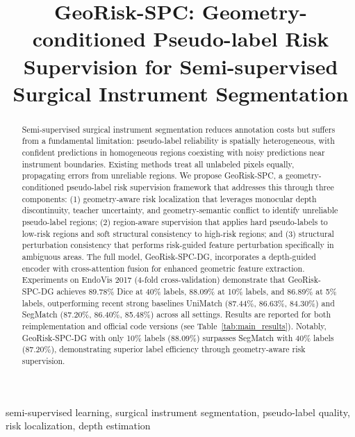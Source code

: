 \documentclass[conference]{IEEEtran}
\begin{document}
\title{GeoRisk-SPC: Geometry-conditioned Pseudo-label Risk Supervision for Semi-supervised Surgical Instrument Segmentation}

\author{
}

\maketitle

\begin{abstract}
Semi-supervised surgical instrument segmentation reduces annotation costs but suffers from a fundamental limitation: pseudo-label reliability is spatially heterogeneous, with confident predictions in homogeneous regions coexisting with noisy predictions near instrument boundaries. Existing methods treat all unlabeled pixels equally, propagating errors from unreliable regions. We propose GeoRisk-SPC, a geometry-conditioned pseudo-label risk supervision framework that addresses this through three components: (1) geometry-aware risk localization that leverages monocular depth discontinuity, teacher uncertainty, and geometry-semantic conflict to identify unreliable pseudo-label regions; (2) region-aware supervision that applies hard pseudo-labels to low-risk regions and soft structural consistency to high-risk regions; and (3) structural perturbation consistency that performs risk-guided feature perturbation specifically in ambiguous areas. The full model, GeoRisk-SPC-DG, incorporates a depth-guided encoder with cross-attention fusion for enhanced geometric feature extraction. Experiments on EndoVis 2017 (4-fold cross-validation) demonstrate that GeoRisk-SPC-DG achieves 89.78\% Dice at 40\% labels, 88.09\% at 10\% labels, and 86.89\% at 5\% labels, outperforming recent strong baselines UniMatch (87.44\%, 86.63\%, 84.30\%) and SegMatch (87.20\%, 86.40\%, 85.48\%) across all settings. Results are reported for both reimplementation and official code versions (see Table~\ref{tab:main_results}). Notably, GeoRisk-SPC-DG with only 10\% labels (88.09\%) surpasses SegMatch with 40\% labels (87.20\%), demonstrating superior label efficiency through geometry-aware risk supervision.
\end{abstract}

\begin{IEEEkeywords}
semi-supervised learning, surgical instrument segmentation, pseudo-label quality, risk localization, depth estimation
\end{IEEEkeywords}
\end{document}
